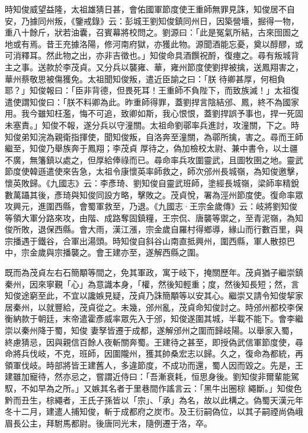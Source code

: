 \begin{pinyinscope}
 時知俊威望益隆，太祖雄猜日甚，會佑國軍節度使王重師無罪見誅，知俊居不自安，乃據同州叛，《鑒戒錄》云：彭城王劉知俊鎮同州日，因築營墻，掘得一物，重八十餘斤，狀若油囊，召賓幕將校問之。劉源曰：「此是冤氣所結，古來囹圄之地或有焉。昔王充據洛陽，修河南府獄，亦獲此物。源聞酒能忘憂，奠以醇醪，或可消釋耳。然此物之出，亦非吉徵也。」知俊命具酒饌祝酹，復瘞之。尋有叛城背主之事。送款於李茂貞。又分兵以襲雍、華，雍州節度使劉捍被擒，送鳳翔害之，華州蔡敬思被傷獲免。太祖聞知俊叛，遣近臣諭之曰：「朕
 待卿甚厚，何相負耶？」知俊報曰：「臣非背德，但畏死耳！王重師不負陛下，而致族滅！」太祖復遣使謂知俊曰：「朕不料卿為此。昨重師得罪，蓋劉捍言陰結邠、鳳，終不為國家用。我今雖知枉濫，悔不可追，致卿如斯，我心恨恨，蓋劉捍誤予事也，捍一死固未塞責。」知俊不報，遂分兵以守潼關。太祖命劉鄩率兵進討，攻潼關，下之。時知俊弟知浣為親衛指揮使，聞知俊叛，自洛奔至潼關，為鄩所擒，害之。尋而王師繼至，知俊乃舉族奔于鳳翔；李茂貞
 厚待之，偽加檢校太尉、兼中書令，以土疆不廣，無籓鎮以處之，但厚給俸祿而已。尋命率兵攻圍靈武，且圖牧圉之地。靈武節度使韓遜遣使來告急，太祖令康懷英率師救之，師次邠州長城嶺，為知俊邀擊，懷英敗歸。《九國志》云：李彥琦、劉知俊自靈武班師，塗經長城嶺，梁師率精銳數萬躡其後，彥琦與知俊同設方略，擊敗之。茂貞悅，署為涇州節度使。復命率眾攻興元，進圍西縣，會蜀軍救至，乃退。《九國志·王宗金歲傳》云：岐將劉知俊等領大軍分路來攻，由階、成路奪固鎮糧，王宗侃、唐襲等禦之，至青泥嶺，為知俊所敗，退保西縣。會大雨，漢江漲，宗金歲自羅村得鄉導，緣山而行數百里，與
 宗播遇于鐵谷，合軍出湯頭。時知俊自斜谷山南直抵興州，圍西縣，軍人散掠巴中，宗金歲與宗播襲之。會王建亦至，遂解西縣之圍。



 既而為茂貞左右石簡顒等間之，免其軍政，寓于岐下，掩關歷年。茂貞猶子繼崇鎮秦州，因來寧覲「心」為意識本身，「權，然後知輕重；度，然後知長短；然，言知俊途窮至此，不宜以讒嫉見疑，茂貞乃誅簡顒等以安其心。繼崇又請令知俊挈家居秦州，以就豐給，茂貞從之。未幾，邠州亂，茂貞命知俊討之。時邠州都校李保衡納款于朝廷，末帝遣霍彥威率眾先入于邠，知俊遂圍其城，半載不能下。會李繼崇以秦州降于蜀，知俊
 妻孥皆遷于成都，遂解邠州之圍而歸岐陽。以舉家入蜀，終慮猜忌，因與親信百餘人夜斬關奔蜀。王建待之甚至，即授偽武信軍節度使，尋命將兵伐岐，不克，班師，因圍隴州，獲其帥桑宏志以歸。久之，復命為都統，再領軍伐岐。時部將皆王建舊人，多違節度，不成功而還，蜀人因而毀之。先是，王建雖加寵待，然亦忌之，嘗謂近侍曰：「吾漸衰耗，恒思身後。劉知俊非爾輩能駕馭，不如早為之所。」又嫉其名者于里巷間作謠言云：「黑牛出圈棕
 繩斷。」知俊色黔而丑生，棕繩者，王氏子孫皆以「宗」、「承」為名，故以此構之。偽蜀天漢元年冬十二月，建遣人捕知俊，斬于成都府之炭市。及王衍嗣偽位，以其子嗣禋尚偽峨眉長公主，拜駙馬都尉。後唐同光末，隨例遷于洛，卒。




\end{pinyinscope}
